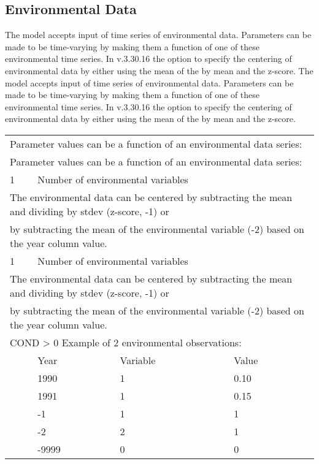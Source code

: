 \hypertarget{env-dat}{}
\subsection{Environmental Data}
The model accepts input of time series of environmental data. Parameters can be made to be time-varying by making them a function of one of these environmental time series. In v.3.30.16 the option to specify the centering of environmental data by either using the mean of the by mean and the z-score. 
The model accepts input of time series of environmental data. Parameters can be made to be time-varying by making them a function of one of these environmental time series. In v.3.30.16 the option to specify the centering of environmental data by either using the mean of the by mean and the z-score. 

\begin{center}
	\vspace*{-\baselineskip}
	\vspace*{-\baselineskip}
	\begin{tabular}{p{1cm} p{3cm} p{3cm} p{7.5cm}}
		\multicolumn{4}{l}{Parameter values can be a function of an environmental data series:} \\
		\multicolumn{4}{l}{Parameter values can be a function of an environmental data series:} \\
		\hline
		1 & \multicolumn{3}{l}{Number of environmental variables} \Tstrut\Bstrut\\
		\multicolumn{4}{l}{The environmental data can be centered by subtracting the mean and dividing by stdev (z-score, -1) or} \\
		\multicolumn{4}{l}{by subtracting the mean of the environmental variable (-2) based on the year column value.} \\
		1 & \multicolumn{3}{l}{Number of environmental variables} \Tstrut\Bstrut\\
		\multicolumn{4}{l}{The environmental data can be centered by subtracting the mean and dividing by stdev (z-score, -1) or} \\
		\multicolumn{4}{l}{by subtracting the mean of the environmental variable (-2) based on the year column value.} \\
		\hline
		\multicolumn{4}{l}{COND > 0  Example of 2 environmental observations:} \Tstrut\\
		  & Year & Variable & Value \Bstrut\\
		\hline
		  & 1990 & 1 & 0.10 \Tstrut\\
		  & 1991 & 1 & 0.15 \\
		  & -1   & 1 & 1 \\
		  & -2   & 2 & 1 \\
		  & -9999 & 0 & 0 \Bstrut\\
		\hline
	\end{tabular}
\end{center}

